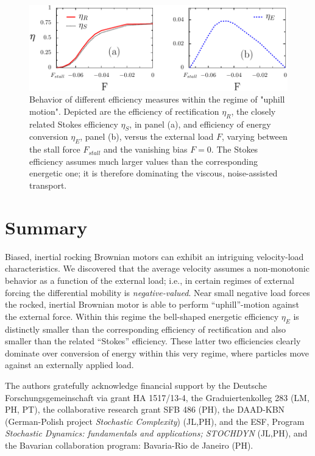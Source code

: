 \documentclass{elsart}
\begin{document}
%
\begin{figure}[htbp]
  \centerline{\includegraphics[angle=0,scale=1]{fig2}}
  \caption{Behavior of different efficiency measures within the regime
    of "uphill motion". Depicted are the efficiency of rectification
    $\eta_R$, the closely related Stokes efficiency $\eta_S$, in panel
    (a), and efficiency of energy conversion $\eta_E$, panel (b),
    versus the external load $F$, varying between the stall force
    $F_{stall}$ and the vanishing bias $F=0$.  The Stokes efficiency
    assumes much larger values than the corresponding energetic one;
    it is therefore dominating the viscous, noise-assisted transport.
  }
\label{fig2}
\end{figure}
%



\section{Summary}
Biased, inertial rocking Brownian motors can exhibit an intriguing
velocity-load characteristics. We discovered that the average
velocity assumes a non-monotonic behavior as a function of the
external load; i.e., in certain regimes of external forcing the
differential mobility is {\it negative-valued}.  Near small negative
load forces the rocked, inertial Brownian motor is able to perform
``uphill''-motion against the external force. Within this regime the
bell-shaped energetic efficiency $\eta_{E}$ is distinctly smaller
than the corresponding efficiency of rectification and also smaller
than the related ``Stokes'' efficiency. These latter two
efficiencies clearly dominate over conversion of energy within this
very regime, where particles move against an externally applied
load.

\ack The authors gratefully acknowledge financial support by the
Deutsche Forschungsgemeinschaft via grant HA 1517/13-4, the
Graduiertenkolleg 283 (LM, PH, PT), the collaborative research grant
SFB 486 (PH), the DAAD-KBN (German-Polish project {\it Stochastic
  Complexity}) (JL,PH), and the ESF, Program {\it Stochastic Dynamics:
  fundamentals and applications; STOCHDYN} (JL,PH), and the Bavarian
collaboration program: Bavaria-Rio de Janeiro (PH).
\end{document}
